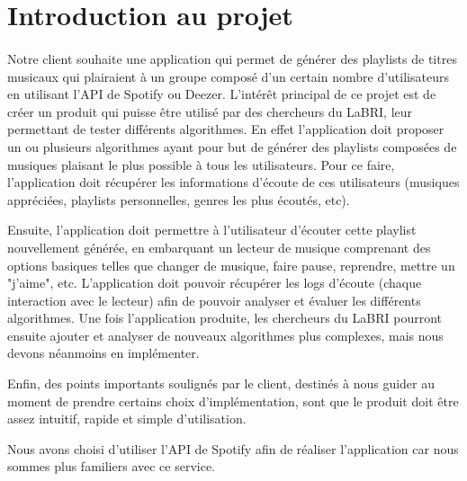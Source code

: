 \documentclass{article}
\begin{document}
		\section{Introduction au projet}
		\paragraph{}
		Notre client souhaite une application qui permet de générer des playlists de titres musicaux qui plairaient à un groupe composé d'un certain nombre d'utilisateurs en utilisant l'API de Spotify ou Deezer. L'intérêt principal de ce projet est de créer un produit qui puisse être utilisé par des chercheurs du LaBRI, leur permettant de tester différents algorithmes. En effet l'application doit proposer un ou plusieurs algorithmes ayant pour but de générer des playlists composées de musiques plaisant le plus possible à tous les utilisateurs. Pour ce faire, l'application doit récupérer les informations d'écoute de ces utilisateurs (musiques appréciées, playlists personnelles, genres les plus écoutés, etc). 
								    
		Ensuite, l'application doit permettre à l'utilisateur d'écouter cette playlist nouvellement générée, en embarquant un lecteur de musique comprenant des options basiques telles que changer de musique, faire pause, reprendre, mettre un "j'aime", etc. L'application doit pouvoir récupérer les logs d'écoute (chaque interaction avec le lecteur) afin de pouvoir analyser et évaluer les différents algorithmes. Une fois l'application produite, les chercheurs du LaBRI pourront ensuite ajouter et analyser de nouveaux algorithmes plus complexes, mais nous devons néanmoins en implémenter. 
								    
		Enfin, des points importants soulignés par le client, destinés à nous guider au moment de prendre certains choix d'implémentation, sont que le produit doit être assez intuitif, rapide et simple d'utilisation. 
								
		Nous avons choisi d'utiliser l'API de Spotify afin de réaliser l'application car nous sommes plus familiers avec ce service.     
								
\end{document}
